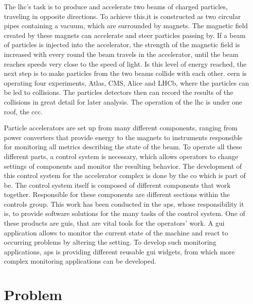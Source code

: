 The \gls{lhc}'s task is to produce and accelerate two beams of charged
particles, traveling in opposite directions. To achieve this,it is constructed
as two circular pipes containing a vacuum, which are surrounded by magnets. The
magnetic field created by these magnets can accelerate and steer particles
passing by. If a beam of particles is injected into the accelerator, the
strength of the magnetic field is increased with every round the beam travels in
the accelerator, until the beam reaches speeds very close to the speed of light.
Is this level of energy reached, the next step is to make particles from the two
beams collide with each other. \gls{cern} is operating four experiments, Atlas,
CMS, Alice and LHCb, where the particles can be led to collisions. The particles
detectors then can record the results of the collisions in great detail for
later analysis. The operation of the \gls{lhc} is under one roof, the \gls{ccc}.
\cite{CernLhc, HowParticleAccsWork}


Particle accelerators are set up from many different components, ranging from
power converters that provide energy to the magnets to instruments responsible
for monitoring all metrics describing the state of the beam. To operate all
these different parts, a control system is necessary, which allows operators to
change settings of components and monitor the resulting behavior. The
development of this control system for the accelerator complex is done by the
\gls{co} which is part of \gls{be}. \cite{ControlSystemBible} The control system
itself is composed of different components that work together. Responsible for
these components are different sections within the controls group.  This work
has been conducted in the \gls{aps}, whose responsibility it is, to provide
software solutions for the many tasks of the control system. One of these
products are \glspl{gui}, that are vital tools for the operators' work.  A
\gls{gui} application allows to monitor the current state of the machine and
react to occurring problems by altering the setting. To develop such monitoring
applications, \gls{aps} is providing different reusable \gls{gui} widgets, from
which more complex monitoring applications can be developed.





\section{Problem}
\label{sec:Introduction:problem}

